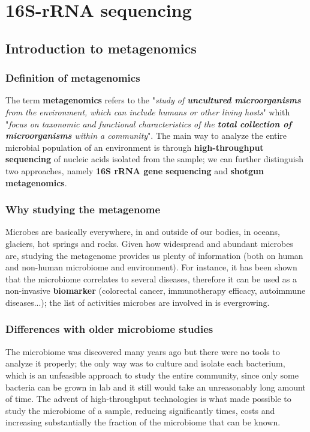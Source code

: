 \graphicspath{{chapters/images/07/}}
\chapter{16S-rRNA sequencing}

\section{Introduction to metagenomics}

  \subsection{Definition of metagenomics}
    The term \textbf{metagenomics} refers to the "\textit{study of \textbf{uncultured microorganisms} from the environment, which can include humans or other living hosts}" whith "\textit{focus on taxonomic and functional characteristics of the \textbf{total collection of microorganisms} within a community}". The main way to analyze the entire microbial population of an environment is through \textbf{high-throughput sequencing} of nucleic acids isolated from the sample; we can further distinguish two approaches, namely \textbf{16S rRNA gene sequencing} and \textbf{shotgun  metagenomics}.

  \subsection{Why studying the metagenome}
    Microbes are basically everywhere, in and outside of our bodies, in oceans, glaciers, hot springs and rocks. Given how widespread and abundant microbes are, studying the metagenome provides us plenty of information (both on human and non-human microbiome and environment). For instance, it has been shown that the microbiome correlates to several diseases, therefore it can be used as a non-invasive \textbf{biomarker} (colorectal cancer, immunotherapy efficacy, autoimmune diseases...); the list of activities microbes are involved in is evergrowing.

  \subsection{Differences with older microbiome studies}
    The microbiome was discovered many years ago but there were no tools to analyze it properly; the only way was to culture and isolate each bacterium, which is an unfeasible approach to study the entire community, since only some bacteria can be grown in lab and it still would take an unreasonably long amount of time. The advent of high-throughput technologies is what made possible to study the microbiome of a sample, reducing significantly times, costs and increasing substantially the fraction of the microbiome that can be known.

